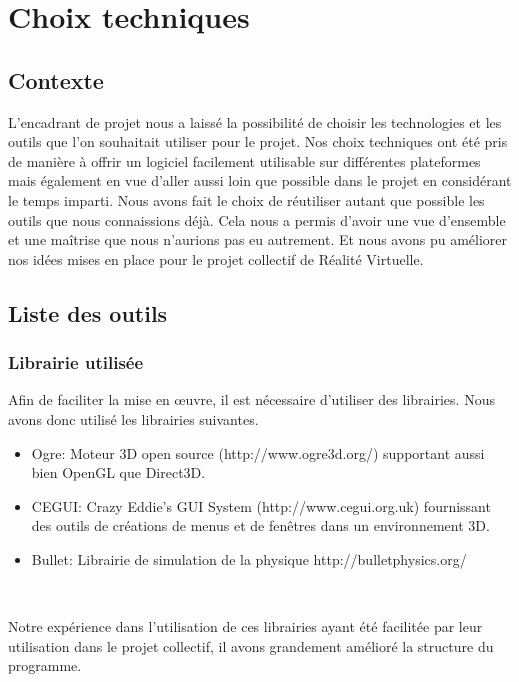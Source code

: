 \documentclass[frenchb,twoside]{EPURapport}
\begin{document}
   
    
    
\chapter{Choix techniques}
    \section{Contexte}
    L'encadrant de projet nous a laissé la possibilité de choisir les technologies et
    les outils que l'on souhaitait utiliser pour le projet. Nos choix techniques
    ont été pris de manière à offrir un logiciel facilement utilisable sur
    différentes plateformes mais également en vue d'aller aussi loin que
    possible dans le projet en considérant le temps imparti. Nous avons fait le
    choix de réutiliser autant que possible les outils que nous connaissions
    déjà. Cela nous a permis d'avoir une vue d'ensemble et une maîtrise que
    nous n'aurions pas eu autrement. Et nous avons pu améliorer nos
    idées mises en place pour le projet collectif de Réalité Virtuelle.
    
    

    \section{Liste des outils}
		\subsection{Librairie utilisée}
		
		Afin de faciliter la mise en \oe{}uvre, il est nécessaire d'utiliser des librairies.
		Nous avons donc utilisé les librairies suivantes.
		\begin{itemize}
			\item Ogre: Moteur 3D open source
			(http://www.ogre3d.org/) supportant aussi bien OpenGL que Direct3D. 
			\item CEGUI: Crazy Eddie's GUI System
			(http://www.cegui.org.uk) fournissant des outils de créations de menus
			et de fenêtres dans un environnement 3D.
			\item Bullet: Librairie de simulation de
			la physique http://bulletphysics.org/
		\end{itemize}
		
		\
		
		Notre expérience dans l'utilisation de ces librairies ayant été facilitée
		par leur utilisation dans le projet collectif, il
		avons grandement amélioré la structure du programme.
		
\end{document}
